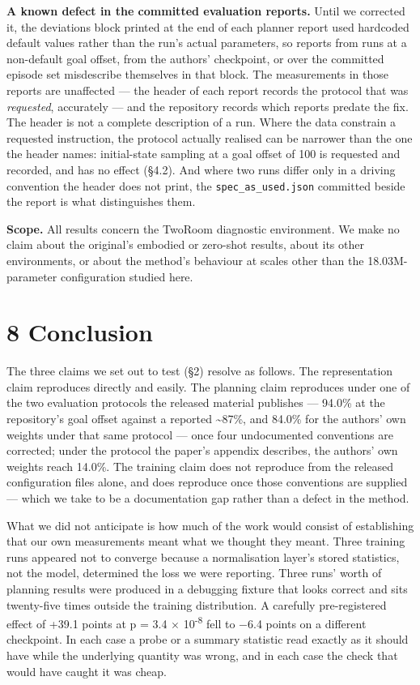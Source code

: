 \documentclass[10pt]{article}
\begin{document}
\textbf{A known defect in the committed evaluation reports.} Until we corrected it,
the deviations block printed at the end of each planner report used hardcoded
default values rather than the run's actual parameters, so reports from runs at
a non-default goal offset, from the authors' checkpoint, or over the committed
episode set misdescribe themselves in that block. The measurements in those reports are unaffected --- the header of each report records the protocol that was \emph{requested}, accurately --- and the repository records which reports predate the fix. The header is not a complete description of a run. Where the data constrain a requested instruction, the protocol actually realised can be narrower than the one the header names: initial-state sampling at a goal offset of 100 is requested and recorded, and has no effect (\S{}4.2). And where two runs differ only in a driving convention the header does not print, the \texttt{spec\_as\_used.json} committed beside the report is what distinguishes them.

\textbf{Scope.} All results concern the TwoRoom diagnostic environment. We make no
claim about the original's embodied or zero-shot results, about its other
environments, or about the method's behaviour at scales other than the
18.03M-parameter configuration studied here.

\section{8 Conclusion}\label{conclusion}

The three claims we set out to test (\S{}2) resolve as follows. The representation
claim reproduces directly and easily. The planning claim reproduces under one of
the two evaluation protocols the released material publishes --- 94.0\% at the
repository's goal offset against a reported \textasciitilde87\%, and 84.0\% for the authors' own
weights under that same protocol --- once four undocumented conventions are
corrected; under the protocol the paper's appendix describes, the authors' own
weights reach 14.0\%. The training claim does not reproduce from the released
configuration files alone, and does reproduce once those conventions are
supplied --- which we take to be a documentation gap rather than a defect in the
method.

What we did not anticipate is how much of the work would consist of establishing
that our own measurements meant what we thought they meant. Three training runs
appeared not to converge because a normalisation layer's stored statistics, not
the model, determined the loss we were reporting. Three runs' worth of planning
results were produced in a debugging fixture that looks correct and sits
twenty-five times outside the training distribution. A carefully pre-registered
effect of +39.1 points at p = 3.4 $\times$ 10\textsuperscript{-8} fell to $-$6.4 points on a different
checkpoint. In each case a probe or a summary statistic read exactly as it
should have while the underlying quantity was wrong, and in each case the check
that would have caught it was cheap.
\end{document}
